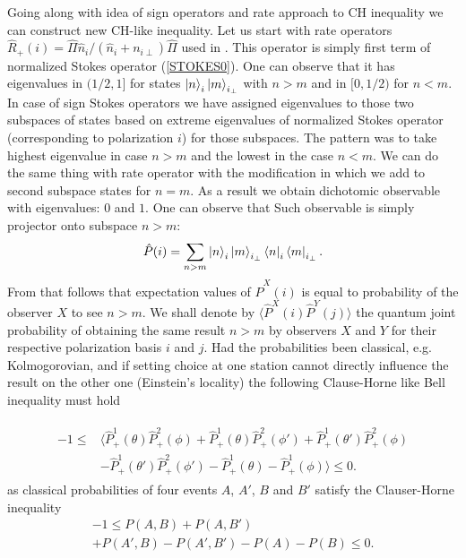 \documentclass[aps,pra, twocolumn, showpacs]{revtex4-2}
\begin{document}
Going along with idea of sign operators and rate approach to CH inequality \cite{ZUKUBELL} we can construct new CH-like inequality. Let us start with rate operators $\hat R_{+}(i)=\hat\Pi\hat n_i/(\hat n_i+n_{i\perp})\hat\Pi $ used in \cite{ZUKUBELL}. This operator is simply first term of normalized Stokes operator (\ref{STOKES0}). One can observe that it has  eigenvalues in $(1/2,1]$ for states $\ket{n}_i\ket{m}_{i_\bot}$ with $n>m$ and in $[0,1/2)$ for $n< m$. In case of sign Stokes operators we have assigned eigenvalues to those two subspaces of states based on extreme eigenvalues of normalized Stokes operator (corresponding to polarization $i$) for those subspaces. The pattern was to take highest eigenvalue in case $n>m$ and the lowest in the case  $n< m$. We can do the same thing with rate operator with the modification in which we add to second subspace states for $n= m$. As a result we obtain dichotomic observable with eigenvalues: $0$ and $1$. One can observe that Such observable is simply projector onto subspace $n>m$:
\begin{equation}
\hat P(i)=\sum_{n>m}\ket{n}_i\ket{m}_{i_\bot}\bra{n}_i\bra{m}_{i_\bot}.
\end{equation}
From that follows that expectation values of $\hat P^X(i)$ is equal to probability of the observer $X$ to see $n>m$. We shall denote by $\langle \hat P^X(i) \hat P^Y(j)\rangle$ the quantum  joint probability of obtaining the same result $n>m$ by observers $X$ and $Y$ for their respective polarization basis $i$ and $j$.
 Had the probabilities been classical, e.g. Kolmogorovian, and if setting choice at one station cannot directly influence the result on the other one (Einstein's locality) the following Clause-Horne like Bell inequality must hold

\begin{align}
\begin{split}
-1\leq&\Big\langle \hat P^1_+(\theta)\hat P^2_+(\phi)+\hat P^1_+(\theta)\hat P^2_+(\phi')+\hat P^1_+(\theta')\hat P^2_+(\phi)\\
&-\hat P^1_+(\theta')\hat P^2_+(\phi')-\hat P^1_+(\theta)-\hat P^1_+(\phi)\Big\rangle\leq 0. \label{chi}
\end{split}
\end{align}
as classical probabilities of four events $A$, $A'$, $B$ and $B'$ satisfy the Clauser-Horne inequality
\begin{eqnarray}
& -1\leq P(A,B)+P(A, B')&\nonumber \\&+ P(A',B)-P(A',B')-P(A)-P(B)\leq 0.&   
\end{eqnarray}
\end{document}
